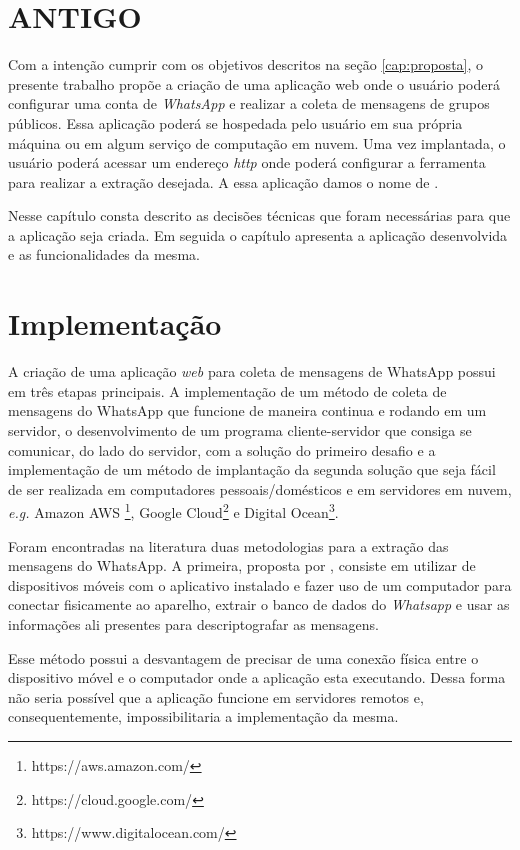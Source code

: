 
\section{ ANTIGO }

Com a intenção cumprir com os objetivos descritos na seção \ref{cap:proposta}, o presente trabalho propõe a criação de uma aplicação web onde o usuário poderá configurar uma conta de \textit{WhatsApp} e realizar a coleta de mensagens de grupos públicos. Essa aplicação poderá se hospedada pelo usuário em sua própria máquina ou em algum serviço de computação em nuvem. Uma vez implantada, o usuário poderá acessar um endereço \textit{http} onde poderá configurar a ferramenta para realizar a extração desejada. A essa aplicação damos o nome de .

Nesse capítulo consta descrito as decisões técnicas que foram necessárias para que a aplicação seja criada. Em seguida o capítulo apresenta a aplicação desenvolvida e as funcionalidades da mesma.

\section{Implementação}

A criação de uma aplicação \textit{web} para coleta de mensagens de WhatsApp possui em três etapas principais. A implementação de um método de coleta de mensagens do WhatsApp que funcione de maneira continua e rodando em um servidor, o desenvolvimento de um programa cliente-servidor que consiga se comunicar, do lado do servidor, com a solução do primeiro desafio e a implementação de um método de implantação da segunda solução que seja fácil de ser realizada em computadores pessoais/domésticos e em servidores em nuvem, \textit{e.g.} Amazon AWS \footnote{https://aws.amazon.com/}, Google Cloud\footnote{https://cloud.google.com/} e Digital Ocean\footnote{https://www.digitalocean.com/}.

Foram encontradas na literatura duas metodologias para a extração das mensagens do WhatsApp. A primeira, proposta por , consiste em utilizar de dispositivos móveis com o aplicativo instalado e fazer uso de um computador para conectar fisicamente ao aparelho, extrair o banco de dados do \textit{Whatsapp} e usar as informações ali presentes para descriptografar as mensagens.

Esse método possui a desvantagem de precisar de uma conexão física entre o dispositivo móvel e o computador onde a aplicação esta executando. Dessa forma não seria possível que a aplicação funcione em servidores remotos e, consequentemente, impossibilitaria a implementação da mesma. 

